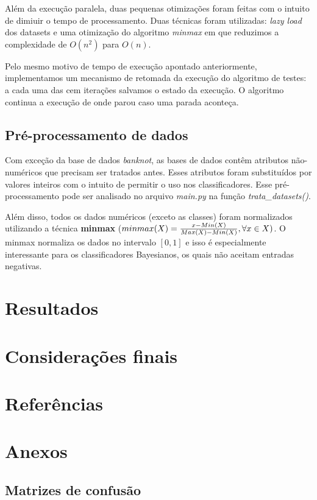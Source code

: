 \documentclass[11pt]{article}
\begin{document}
Além da execução paralela, duas pequenas otimizações foram feitas com o intuito
de dimiuir o tempo de processamento. Duas técnicas foram utilizadas:
\textit{lazy load} dos datasets e uma otimização do algoritmo \textit{minmax}
em que reduzimos a complexidade de $O(n^2)$ para $O(n)$.


Pelo mesmo motivo de tempo de execução apontado anteriormente, implementamos um
mecanismo de retomada da execução do algoritmo de testes: a cada uma das cem
iterações salvamos o estado da execução. O algoritmo continua a execução de
onde parou caso uma parada aconteça.

\subsection{Pré-processamento de dados}

Com exceção da base de dados \textit{banknot}, as bases de dados contêm
atributos não-numéricos que precisam ser tratados antes. Esses atributos foram
substituídos por valores inteiros com o intuito de permitir o uso nos
classificadores. Esse pré-processamento pode ser analisado no arquivo
\textit{main.py} na função \textit{trata\_datasets()}.

Além disso, todos os dados numéricos (exceto as classes) foram normalizados
utilizando a técnica \textbf{minmax} ($minmax(X) = {x-Min(X)\over{Max(X)-Min(X)}}, \forall x \in X)$. 
O minmax normaliza os dados no intervalo $[0,1]$ e isso é especialmente
interessante para os classificadores Bayesianos, os quais não aceitam entradas
negativas.

\section{Resultados}
\section{Considerações finais}
\section{Referências}
\section{Anexos}
\subsection{Matrizes de confusão}
\end{document}
